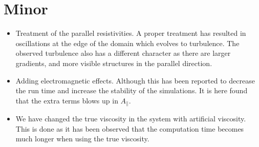 \section{Minor}

\begin{itemize}[noitemsep,nolistsep]
    \item Treatment of the parallel resistivities.
        A proper treatment has resulted in oscillations at the edge of the domain which evolves to turbulence.
        The observed turbulence also has a different character as there are larger gradients, and more visible structures in the parallel direction.
    \item Adding electromagnetic effects.
        Although this has been reported to decrease the run time and increase the stability of the simulations.
        It is here found that the extra terms blows up in $A_\|$.
    \item We have changed the true viscosity in the system with artificial viscosity.
        This is done as it has been observed that the computation time becomes much longer when using the true viscosity.
\end{itemize}
